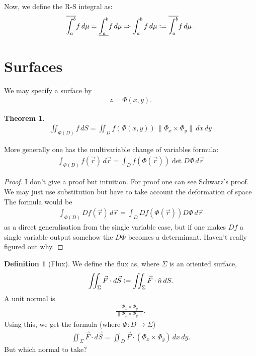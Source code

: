 \documentclass{article}
\newcommand{\vc}{\vcentcolon}
\theoremstyle{definition}
\newtheorem{thm}{Theorem}[subsubsection]
\newtheorem{defn}{Definition}[subsubsection]
\begin{document}
Now, we define the R-S integral as:
\begin{align*}
	\overline{\int_a^b} f\,d\mu=\underline{\int_a^b} f\,d\mu\Rightarrow \int_a^b f\,d\mu\vc=\overline{\int_a^b} f\,d\mu\,.
\end{align*}

\section{Surfaces}
We may specify a surface by
\begin{align*}
	z=\Phi(x,y).
\end{align*}
\begin{thm}
	\begin{align*}
		\iint_{\Phi(D)}f\,dS=\iint_Df(\Phi(x,y))\,\lVert\Phi_x\times\Phi_y\rVert\,dx\,dy
	\end{align*}
\end{thm}
More generally one has the multivariable change of variables formula:
\begin{align*}
	\int_{\Phi(D)}f(\vec r)\,d\vec r=\int_Df(\Phi(\vec r))\det D\Phi\,d\vec r
\end{align*}
\begin{proof}
	I don't give a proof but intuition. For proof one can see Schwarz's proof.
	We may just use substitution but have to take account the deformation of space
	The formula would be
	\begin{align*}
		\int_{\Phi(D)}Df(\vec r)\,d\vec r=\int_DDf(\Phi(\vec r))D\Phi\,d\vec r
	\end{align*}
	as a direct generalisation from the single variable case, but if one makes $Df$ a single variable output somehow the $D\Phi$ becomes a determinant. Haven't really figured out why.
\end{proof}
\begin{defn}[Flux]
	We define the flux as, where $\Sigma$ is an oriented surface,
	\begin{align*}
		\iint_\Sigma\vec F\cdot d\vec S\vc=\iint_\Sigma\vec F\cdot\hat{n}\,dS.
	\end{align*}
	A unit normal is
	\begin{align*}
		\frac{\Phi_x\times\Phi_y}{\lVert\Phi_x\times\Phi_y\rVert}.
	\end{align*}
	Using this, we get the formula (where $\Phi:D\rightarrow\Sigma$)
	\begin{align*}
		\iint_\Sigma\vec F\cdot d\vec S=\iint_D\vec F\cdot(\Phi_x\times\Phi_y)\,dx\,dy.
	\end{align*}
	But which normal to take?
\end{defn}
\end{document}
